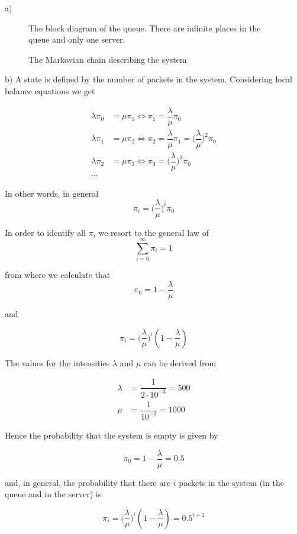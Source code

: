 a)
\begin{figure}[H]
	\centering
	\scalebox{0.8}{}
	\caption{The block diagram of the queue. There are infinite places in the
    queue and only one server.}
\end{figure}

\begin{figure}[H]
	\centering
	\scalebox{1}{}
	\caption{The Markovian chain describing the system}
\end{figure}

b)
A state is defined by the number of packets in the system. Considering local
balance equations we get

\begin{align*}
  \lambda \pi_0 &= \mu \pi_1 \Leftrightarrow \pi_1 = \dfrac{\lambda}{\mu}\pi_0\\
  \lambda \pi_1 &= \mu \pi_2 \Leftrightarrow \pi_2 = \dfrac{\lambda}{\mu}\pi_1 = \Big(\dfrac{\lambda}{\mu}\Big)^2\pi_0\\
  \lambda \pi_2 &= \mu \pi_3 \Leftrightarrow \pi_3 = \Big(\dfrac{\lambda}{\mu}\Big)^3\pi_0\\
  \cdots
\end{align*}

In other words, in general $$\pi_i = \Big(\dfrac{\lambda}{\mu}\Big)^i\pi_0$$

In order to identify all $\pi_i$ we resort to the general law of
$$\sum_{i=0}^{\infty} \pi_i = 1$$

from where we calculate that
$$\pi_0 = 1 - \dfrac{\lambda}{\mu}$$

and

$$\pi_i = \Big(\dfrac{\lambda}{\mu}\Big)^i(1 - \dfrac{\lambda}{\mu})$$

The values for the intensities $\lambda$ and $\mu$ can be derived from

\begin{align*}
  \lambda &= \dfrac{1}{2 \cdot 10^{-3}} = 500 \\
  \mu     &= \dfrac{1}{10^{-3}} = 1000
\end{align*}

Hence the probability that the system is empty is given by

$$\pi_0 = 1 - \dfrac{\lambda}{\mu} = 0.5$$

and, in general, the probability that there are $i$ packets in the system
(in the queue and in the server) is

$$\pi_i = \Big(\dfrac{\lambda}{\mu}\Big)^i(1 - \dfrac{\lambda}{\mu}) = 0.5^{i+1}$$


